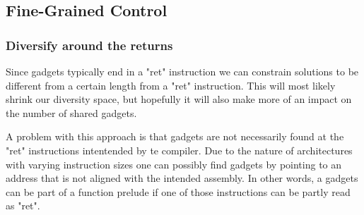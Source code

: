 \subsection{Fine-Grained Control}

\subsubsection{Diversify around the returns}

Since gadgets typically end in a "ret" instruction we can constrain solutions to be different
from a certain length from a "ret" instruction. This will most likely shrink our diversity
space, but hopefully it will also make more of an impact on the number of shared gadgets.

A problem with this approach is that gadgets are not necessarily found at the "ret"
instructions intentended by te compiler. Due to the nature of architectures with varying
instruction sizes one can possibly find gadgets by pointing to an address that is not
aligned with the intended assembly. In other words, a gadgets can be part of a function
prelude if one of those instructions can be partly read as "ret".

\subsubsection{}
